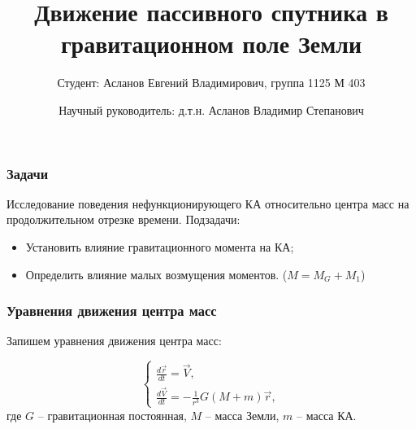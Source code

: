 \documentclass[10pt,pdf,hyperref={unicode}]{beamer}
\title{Движение пассивного спутника в гравитационном поле Земли}
\author[Асланов Е.В.]{Студент: Асланов Евгений Владимирович, группа 1125 М 403\\ \and Научный руководитель: д.т.н. Асланов Владимир Степанович}
\date[\today]{}
\begin{document}
\begin{frame}
\titlepage
\end{frame} 

\begin{frame}
\frametitle{Задачи}
	Исследование поведения нефункционирующего КА относительно центра масс на продолжительном отрезке времени.
	Подзадачи: 
	\begin{itemize}
		\item Установить влияние гравитационного момента на КА;
		\item Определить влияние малых возмущения моментов. ($M = M_G + M_1$) 
	\end{itemize}
\end{frame}

\begin{frame}
\frametitle{Уравнения движения центра масс}
	Запишем уравнения движения центра масс:
	
	\begin{equation*}
		\begin{cases}
			\frac{d\vec{r}}{dt} = \vec{V},\\
			\frac{d\vec{V}}{dt} = -\frac{1}{r^3} G \left(M + m\right) \vec{r},
		\end{cases}
	\end{equation*}
	где $G$ – гравитационная постоянная, $M$ – масса Земли, $m$ – масса КА.
\end{frame}
\end{document}
